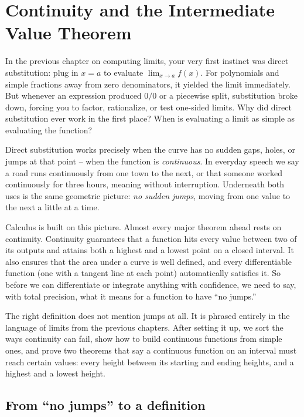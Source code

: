 \chapter{Continuity and the Intermediate Value Theorem}

In the previous chapter on computing limits, your very first instinct was direct
substitution: plug in $x=a$ to evaluate $\lim_{x\to a} f(x)$. For polynomials and simple
fractions away from zero denominators, it yielded the limit immediately. But whenever an expression
produced $0/0$ or a piecewise split, substitution broke down, forcing you to factor,
rationalize, or test one-sided limits. Why did direct substitution ever work in the first
place? When is evaluating a limit as simple as evaluating the function?

Direct substitution works precisely when the curve has no sudden gaps, holes, or jumps at that point -- when the function is \emph{continuous}. In everyday speech we say a road runs continuously from one town to the next, or that someone worked continuously for three hours, meaning without interruption. Underneath both uses is the same geometric picture: \emph{no sudden jumps}, moving from one value to the next a little at a time.

Calculus is built on this picture. Almost every major theorem ahead rests on continuity. Continuity guarantees that a function hits every value between two of its outputs and attains both a highest and a lowest point on a closed interval. It also ensures that the area under a curve is well defined, and every differentiable function (one with a tangent line at each point) automatically satisfies it. So before we can differentiate or integrate anything with
confidence, we need to say, with total precision, what it means for a function to have
``no jumps.''

The right definition does not mention jumps at all. It is phrased entirely
in the language of limits from the previous chapters. After setting it up, we sort the ways
continuity can fail, show how to build continuous functions from simple ones, and prove two
theorems that say a continuous function on an interval must reach certain values: every
height between its starting and ending heights, and a highest and a lowest height.

\section{From ``no jumps'' to a definition}
\label{ch08:no-jumps}


